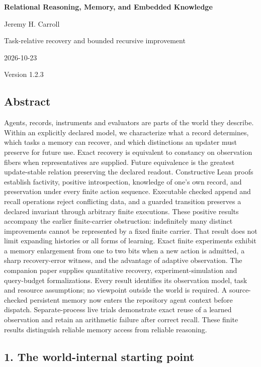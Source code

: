 \documentclass[
  10pt,
]{article}
\author{}
\date{}
\begin{document}
\begin{center}
{\LARGE\bfseries Relational Reasoning, Memory, and Embedded Knowledge\par}
Jeremy H. Carroll\par
Task-relative recovery and bounded recursive improvement\par
2026-10-23\par
Version 1.2.3\par
\end{center}

\subsection{Abstract}\label{abstract}

Agents, records, instruments and evaluators are parts of the world they describe. Within an explicitly declared model, we characterize what a record determines, which tasks a memory can recover, and which distinctions an updater must preserve for future use. Exact recovery is equivalent to constancy on observation fibers when representatives are supplied. Future equivalence is the greatest update-stable relation preserving the declared readout. Constructive Lean proofs establish factivity, positive introspection, knowledge of one's own record, and preservation under every finite action sequence. Executable checked append and recall operations reject conflicting data, and a guarded transition preserves a declared invariant through arbitrary finite executions. These positive results accompany the earlier finite-carrier obstruction: indefinitely many distinct improvements cannot be represented by a fixed finite carrier. That result does not limit expanding histories or all forms of learning. Exact finite experiments exhibit a memory enlargement from one to two bits when a new action is admitted, a sharp recovery-error witness, and the advantage of adaptive observation. The companion paper supplies quantitative recovery, experiment-simulation and query-budget formalizations. Every result identifies its observation model, task and resource assumptions; no viewpoint outside the world is required. A source-checked persistent memory now enters the repository agent context before dispatch. Separate-process live trials demonstrate exact reuse of a learned observation and retain an arithmetic failure after correct recall. These finite results distinguish reliable memory access from reliable reasoning.

\subsection{1. The world-internal starting point}\label{the-world-internal-starting-point}
\end{document}
